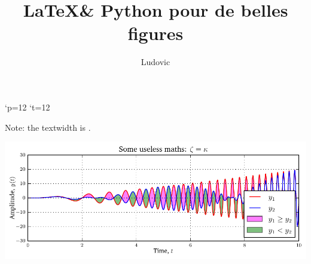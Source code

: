 \documentclass[10pt,a4paper,twoside]{article}
\author{Ludovic}
\title{\LaTeX \& Python pour de belles figures}
\newlength\textwidthcm
\begin{document}
{\catcode`p=12 \catcode`t=12 \gdef\cm#1pt{#1cm}}

\maketitle

\noindent Note: the textwidth is \expandafter\cm\the{}.

\blindmathpaper

\centerline{\includegraphics{fig}}

\blindmathpaper
\end{document}
